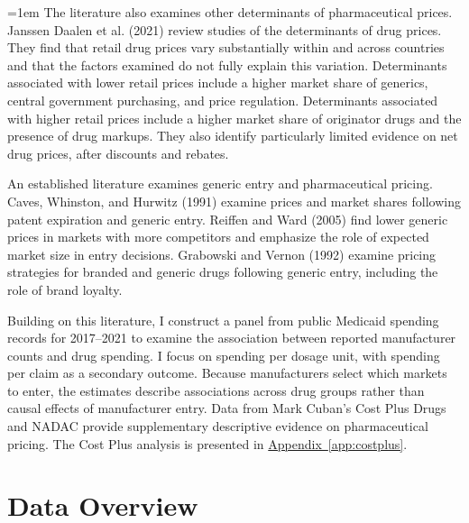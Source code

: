 \documentclass[12pt]{article}
\begin{document}
\begingroup
\emergencystretch=1em
The literature also examines other determinants of pharmaceutical prices. Janssen Daalen et al. (2021) review studies of the determinants of drug prices. They find that retail drug prices vary substantially within and across countries and that the factors examined do not fully explain this variation. Determinants associated with lower retail prices include a higher market share of generics, central government purchasing, and price regulation. Determinants associated with higher retail prices include a higher market share of originator drugs and the presence of drug markups. They also identify particularly limited evidence on net drug prices, after discounts and rebates.
\par
\endgroup

An established literature examines generic entry and pharmaceutical pricing. Caves, Whinston, and Hurwitz (1991) examine prices and market shares following patent expiration and generic entry. Reiffen and Ward (2005) find lower generic prices in markets with more competitors and emphasize the role of expected market size in entry decisions. Grabowski and Vernon (1992) examine pricing strategies for branded and generic drugs following generic entry, including the role of brand loyalty.

Building on this literature, I construct a panel from public Medicaid spending records for 2017--2021 to examine the association between reported manufacturer counts and drug spending. I focus on spending per dosage unit, with spending per claim as a secondary outcome. Because manufacturers select which markets to enter, the estimates describe associations across drug groups rather than causal effects of manufacturer entry. Data from Mark Cuban's Cost Plus Drugs and NADAC provide supplementary descriptive evidence on pharmaceutical pricing. The Cost Plus analysis is presented in \hyperref[app:costplus]{Appendix~\ref*{app:costplus}}.

\section{Data Overview}
\end{document}
